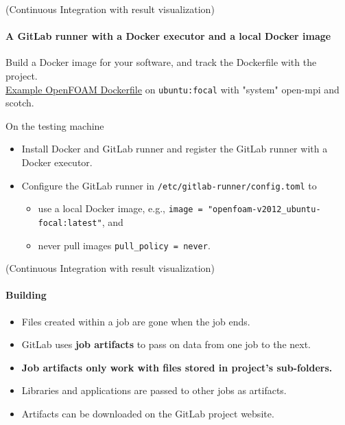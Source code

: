 \documentclass[
	aspectratio=169,%
	color={accentcolor=2d},
	logo=true,%
	colorframetitle=true,%
	]{tudabeamer}
\begin{document}
\begin{frame}{(Continuous Integration with result visualization)} 
    \framesubtitle{A GitLab runner with a Docker executor and a local Docker image}

    \vfill 
    Build a Docker image for your software, and track the Dockerfile with the project.\\
    \medskip
    \href{https://gitlab.com/tmaric/fvc-reconstruct/-/tree/main/docker}{Example OpenFOAM Dockerfile} on \texttt{ubuntu:focal} with "system" open-mpi and scotch.

    \medskip
    On the testing machine
    \begin{itemize}
        \item Install Docker and GitLab runner and register the GitLab runner with a Docker executor.
        \item Configure the GitLab runner in \texttt{/etc/gitlab-runner/config.toml} to
            \begin{itemize}
                \item use a local Docker image, e.g., \texttt{image = "openfoam-v2012\_ubuntu-focal:latest"}, and
                \item never pull images \texttt{pull\_policy = never}.
            \end{itemize}
    \end{itemize}


\end{frame}

\begin{frame}{(Continuous Integration with result visualization)} 
    \framesubtitle{Building}

    \vfill
    \begin{itemize}
        \item Files created within a job are gone when the job ends. 
        \item GitLab uses \textbf{job artifacts} to pass on data from one job to the next. 
        \item \textbf{Job artifacts only work with files stored in project's sub-folders.} 
        \item Libraries and applications are passed to other jobs as artifacts. 
        \item Artifacts can be downloaded on the GitLab project website.  
    \end{itemize}

\end{frame}
\end{document}
